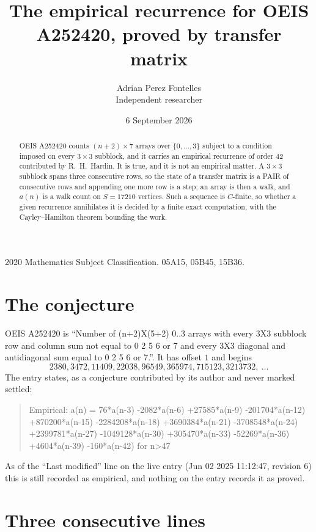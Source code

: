 \documentclass[11pt,a4paper]{article}
\title{The empirical recurrence for OEIS A252420, proved by transfer matrix}
\author{Adrian Perez Fontelles\\ \small Independent researcher}
\date{6 September 2026}
\theoremstyle{plain}
\theoremstyle{definition}
\begin{document}
\maketitle

\begin{abstract}
OEIS A252420 counts $(n+2)\times7$ arrays over $\{0,\dots,3\}$ subject to a condition imposed on
every $3\times3$ subblock, and it carries an empirical recurrence of order $42$
contributed by R.~H.~Hardin. It is true, and it is not an empirical matter. A $3\times3$
subblock spans three consecutive rows, so the state of a transfer matrix is a PAIR of
consecutive rows and appending one more row is a step; an array is then a walk, and
$a(n)$ is a walk count on $S=17210$ vertices. Such a sequence is $C$-finite, so whether a given
recurrence annihilates it is decided by a finite exact computation, with the Cayley--Hamilton
theorem bounding the work.
\end{abstract}

\noindent\small 2020 Mathematics Subject Classification. 05A15, 05B45, 15B36.\normalsize

\section{The conjecture}

OEIS A252420 is ``Number of (n+2)X(5+2) 0..3 arrays with every 3X3 subblock row and column sum not equal to 0 2 5 6 or 7 and every 3X3 diagonal and antidiagonal sum equal to 0 2 5 6 or 7.''. It has offset $1$ and begins
\[
2380, 3472, 11409, 22038, 96549, 365974, 715123, 3213732,\ \dots
\]
The entry states, as a conjecture contributed by its author and never marked settled:
\begin{quote}
Empirical: a(n) = 76*a(n-3) -2082*a(n-6) +27585*a(n-9) -201704*a(n-12) +870200*a(n-15) -2284208*a(n-18) +3690384*a(n-21) -3708548*a(n-24) +2399781*a(n-27) -1049128*a(n-30) +305470*a(n-33) -52269*a(n-36) +4604*a(n-39) -160*a(n-42) for n>47
\end{quote}
As of the ``Last modified'' line on the live entry (Jun 02 2025 11:12:47, revision 6) this is still
recorded as empirical, and nothing on the entry records it as proved.

\section{Three consecutive lines}
\end{document}
